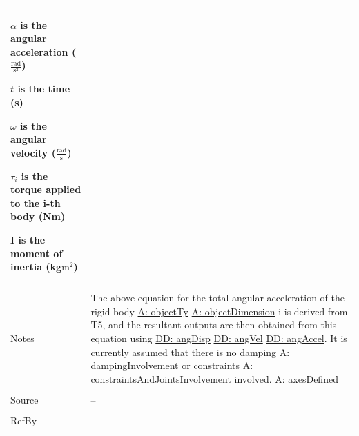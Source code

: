 \documentclass[12pt]{article}
\begin{document}
\begin{minipage}{\textwidth}
\begin{tabular}{>{\raggedright}p{}>{\raggedright\arraybackslash}p{}}
\begin{symbDescription}
                        \item{$α$ is the angular acceleration ($\frac{\text{rad}}{\text{s}^{2}}$)}
                        \item{$t$ is the time (s)}
                        \item{$ω$ is the angular velocity ($\frac{\text{rad}}{\text{s}}$)}
                        \item{${τ_{i}}$ is the torque applied to the i-th body (Nm)}
                        \item{$\mathbf{I}$ is the moment of inertia (kg$\text{m}^{2}$)}
                        \end{symbDescription}
          \\ \midrule \\
          Notes & The above equation for the total angular acceleration of the rigid body \hyperref[assumpOT]{A: objectTy} \hyperref[assumpOD]{A: objectDimension} i is derived from T5, and the resultant outputs are then obtained from this equation using \hyperref[DD:angDisp]{DD: angDisp} \hyperref[DD:angVel]{DD: angVel} \hyperref[DD:angAccel]{DD: angAccel}. It is currently assumed that there is no damping \hyperref[assumpDI]{A: dampingInvolvement} or constraints \hyperref[assumpCAJI]{A: constraintsAndJointsInvolvement} involved. \hyperref[assumpAD]{A: axesDefined}
          \\ \midrule \\
          Source & --
          \\ \midrule \\
          RefBy & 
          \\ \bottomrule
          \end{tabular}
          \end{minipage}
\par~
\end{document}
